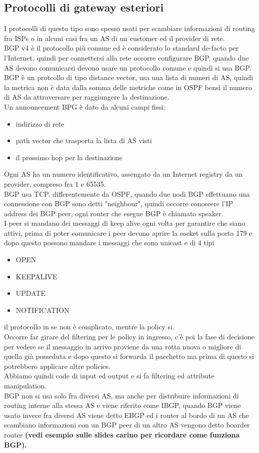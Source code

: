 \documentclass[12pt, oneside]{extbook} %
\begin{document}
\subsection{Protocolli di gateway esteriori}
I protocolli di questo tipo sono spesso usati per scambiare informazioni di routing fra ISPs o in alcuni casi fra un  AS di un customer ed il provider di rete.
\\BGP v4 è il protocollo più comune ed è considerato lo standard de-facto per l'Internet, quindi per connettersi alla rete occorre configurare BGP, quando due AS devono comunicarsi devono usare un protocollo comune e quindi si usa BGP.
\\BGP è un protcollo di tipo distance vector, usa una lista di numeri di AS, quindi la metrica non è data dalla somma delle metriche come in OSPF bensì il numero di AS da attraversare per raggiungere la destinazione.
\\Un announcement BPG è dato da alcuni campi fissi:
\begin{itemize}
	\item indirizzo di rete
	\item path vector che trasporta la lista di AS visti
	\item il prossimo hop per la destinazione
\end{itemize}
Ogni AS ha un numero identificativo, assengato da un Internet registry  da un provider, compreso fra 1 e 65535.
\\BGP usa TCP, differentemente da OSPF, quando due nodi BGP effettuano una connessione con BGP sono detti "neighbour", quindi occorre conoscere l'IP address dei BGP peer, ogni router che esegue BGP è chiamato speaker.
\\I peer si mandano dei messaggi di keep alive ogni volta per garantire che siano attivi, prima di poter comunicare i peer devono aprire la socket sulla porta 179 e dopo questo possono mandare i messaggi che sono unicast e di 4 tipi 
\begin{itemize}
    \item OPEN
    \item KEEPALIVE
    \item UPDATE
    \item NOTIFICATION
\end{itemize}
il protocollo in se non è complicato, mentre la policy si.
\\Occorre far girare del filtering per le policy in ingresso, c'è poi la fase di decisione per vedere se il messaggio in arrivo proviene da una rotta nuova o migliore di quella già posseduta e dopo questo si forwarda il pacchetto ma prima di questo si potrebbero applicare altre policies.
\\Abbiamo quindi code di input ed output e si fa filtering ed attribute manipulation.
\\BGP non si usa solo fra diversi AS, ma anche per distribuire informazioni di routing interne alla stessa AS e viene riferito come IBGP, quando BGP viene usato invece fra diversi AS viene detto EBGP ed i router al bordo di un AS che scambiano informazioni con un BGP peer di un altro AS vengono detto boarder router \textbf{(vedi esempio sulle slides carino per ricordare come funziona BGP).}
\end{document}
